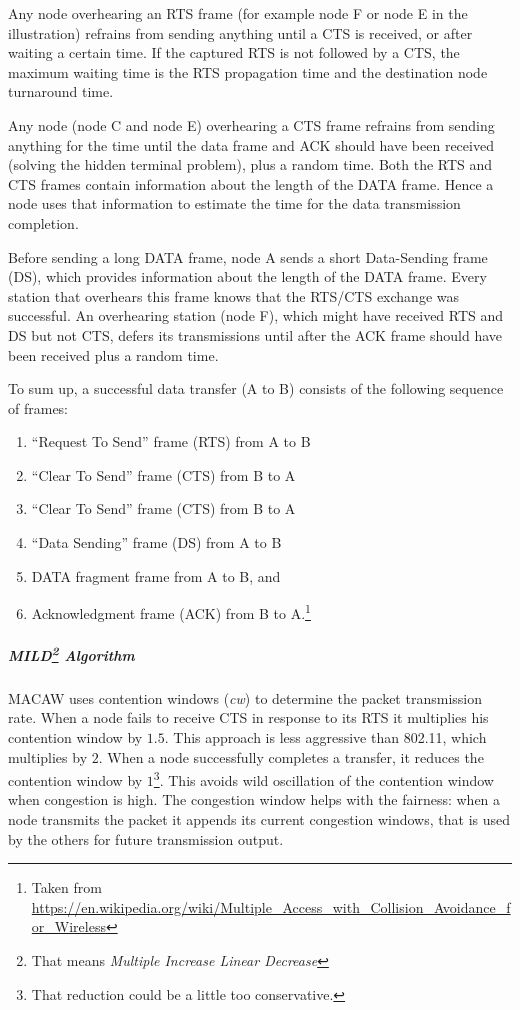 Any node overhearing an RTS frame (for example node F or node E in the
illustration) refrains from sending anything until a CTS is received, or after
waiting a certain time. If the captured RTS is not followed by a CTS, the
maximum waiting time is the RTS propagation time and the destination node
turnaround time.

Any node (node C and node E) overhearing a CTS frame refrains from sending
anything for the time until the data frame and ACK should have been received
(solving the hidden terminal problem), plus a random time. Both the RTS and CTS
frames contain information about the length of the DATA frame. Hence a node uses
 that information to estimate the time for the data transmission completion.

Before sending a long DATA frame, node A sends a short Data-Sending frame (DS),
which provides information about the length of the DATA frame. Every station
that overhears this frame knows that the RTS/CTS exchange was successful. An
overhearing station (node F), which might have received RTS and DS but not CTS,
defers its transmissions until after the ACK frame should have been received
plus a random time.

To sum up, a successful data transfer (A to B) consists of the following
sequence of frames:
\begin{enumerate}
\item ``Request To Send'' frame (RTS) from A to B
\item ``Clear To Send'' frame (CTS) from B to A
\item ``Clear To Send'' frame (CTS) from B to A
\item ``Data Sending'' frame (DS) from A to B
\item DATA fragment frame from A to B, and
\item Acknowledgment frame (ACK) from B to A.\footnote{
Taken from
\url{https://en.wikipedia.org/wiki/Multiple_Access_with_Collision_Avoidance_for_Wireless}
}
\end{enumerate}


\subparagraph*{MILD\footnote{That means \textit{Multiple Increase
  Linear Decrease}} Algorithm} MACAW uses contention windows (\textit{cw}) to
determine the packet transmission rate. When a node fails to receive CTS in
response to its RTS it multiplies his contention window by $1.5$. This approach
is less aggressive than 802.11, which multiplies by $2$. When a node
successfully completes a transfer, it reduces the contention window by
$1$\footnote{That reduction could be a little too conservative.}. This avoids
wild oscillation of the contention window when congestion is high.
The congestion window helps with the fairness: when a node transmits the
packet it appends its current congestion windows, that is used by the others
for future transmission output.
\label{subp:mac:mild}

